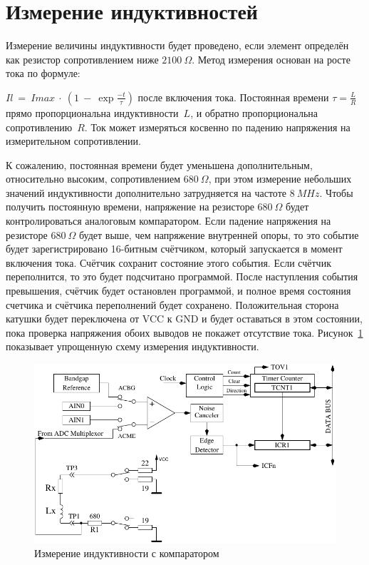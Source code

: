 \section{Измерение индуктивностей }
Измерение величины индуктивности будет проведено, если  элемент определён как резистор сопротивлением 
ниже \(2100~\Omega\).
Метод измерения основан на росте тока по формуле:

\(Il~=~Imax~\cdot~(1~-~\exp{\frac{-t}{\tau}})\) 
после включения тока. Постоянная  времени \(\tau = \frac{L}{R}\) прямо пропорциональна индуктивности~\(L\), 
и обратно пропорциональна сопротивлению~\(R\). 
Ток может измеряться косвенно по падению напряжения на измерительном сопротивлении.

К сожалению, постоянная времени будет уменьшена дополнительным, относительно высоким, 
сопротивлением \(680~\Omega\), при этом измерение небольших значений индуктивности дополнительно затрудняется 
на частоте \(8~MHz\). Чтобы получить постоянную времени, напряжение на резисторе \(680~\Omega\) будет 
контролироваться  аналоговым компаратором. Если падение напряжения на резисторе \(680~\Omega\) будет выше, 
чем напряжение внутренней опоры, то это событие будет зарегистрировано 16-битным счётчиком, который запускается 
в момент включения тока. Счётчик сохранит состояние этого события. Если счётчик переполнится, то это будет 
подсчитано программой. После наступления события превышения, счётчик будет остановлен программой, и полное 
время состояния счетчика и счётчика переполнений будет сохранено. Положительная сторона катушки будет переключена 
от VCC к GND и будет оставаться в этом состоянии, пока проверка напряжения обоих выводов не покажет отсутствие тока. 
Рисунок~\ref{fig:Inductance} показывает упрощенную схему измерения индуктивности.
\begin{figure}[H]
\centering
\includegraphics[width=.8\textwidth]{../FIG/Inductance.pdf}
\caption{Измерение индуктивности с компаратором}
\label{fig:Inductance}
\end{figure}

